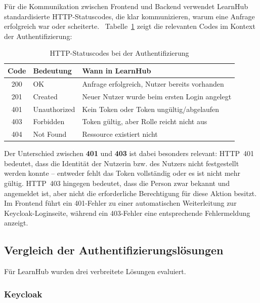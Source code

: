 Für die Kommunikation zwischen Frontend und Backend verwendet LearnHub
standardisierte HTTP-Statuscodes, die klar kommunizieren, warum eine
Anfrage erfolgreich war oder scheiterte.~\cite{quarkus-security-jwt}
Tabelle~\ref{tab:http-status} zeigt die relevanten Codes im Kontext
der Authentifizierung:

\begin{table}[H]
    \centering
    \caption{HTTP-Statuscodes bei der Authentifizierung}
    \label{tab:http-status}
    \begin{tabular}{cll}
        \hline
        \textbf{Code} & \textbf{Bedeutung} & \textbf{Wann in LearnHub} \\
        \hline
        200 & OK & Anfrage erfolgreich, Nutzer bereits vorhanden \\
        201 & Created & Neuer Nutzer wurde beim ersten Login angelegt \\
        401 & Unauthorized & Kein Token oder Token ungültig/abgelaufen \\
        403 & Forbidden & Token gültig, aber Rolle reicht nicht aus \\
        404 & Not Found & Ressource existiert nicht \\
        \hline
    \end{tabular}
\end{table}

Der Unterschied zwischen \textbf{401} und \textbf{403} ist dabei
besonders relevant: HTTP~401 bedeutet, dass die Identität der
Nutzerin bzw. des Nutzers nicht festgestellt werden konnte -- entweder
fehlt das Token vollständig oder es ist nicht mehr gültig. HTTP~403
hingegen bedeutet, dass die Person zwar bekannt und angemeldet ist,
aber nicht die erforderliche Berechtigung für diese Aktion besitzt.
Im Frontend führt ein 401-Fehler zu einer automatischen Weiterleitung
zur Keycloak-Loginseite, während ein 403-Fehler eine entsprechende
Fehlermeldung anzeigt.

\subsection{Vergleich der Authentifizierungslösungen}

Für LearnHub wurden drei verbreitete Lösungen evaluiert.

\subsubsection{Keycloak}

